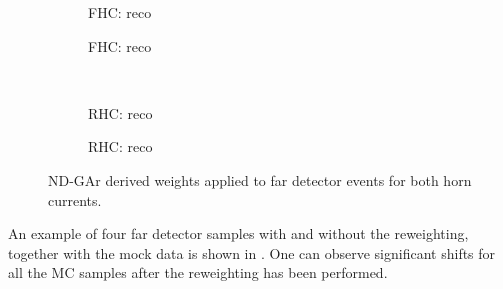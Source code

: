 \begin{figure}[h]
	\begin{subfigure}[t]{.5\linewidth}
		\begin{adjustbox}{max totalsize=\linewidth, center}
			
		\end{adjustbox}
		\caption{FHC: reco \numu}
	\end{subfigure}
	\hfill
	\begin{subfigure}[t]{.5\linewidth}
		\begin{adjustbox}{max totalsize=\linewidth, center}
			
		\end{adjustbox}
		\caption{FHC: reco \nue}
	\end{subfigure}	\\
	\begin{subfigure}[t]{.5\linewidth}
		\begin{adjustbox}{max totalsize=\linewidth, center}
			
		\end{adjustbox}
		\caption{RHC: reco \numu}
	\end{subfigure}
	\hfill
	\begin{subfigure}[t]{.5\linewidth}
		\begin{adjustbox}{max totalsize=\linewidth, center}
			
		\end{adjustbox}
		\caption{RHC: reco \nue}
	\end{subfigure}
	\caption[ND-GAr derived weights applied to far detector events]{ND-GAr derived weights applied to far detector events for both horn currents.}
	\label{fig:fdWeights}
\end{figure}

An example of four far detector samples with and without the reweighting, together with the mock data is shown in .
One can observe significant shifts for all the MC samples after the reweighting has been performed.

